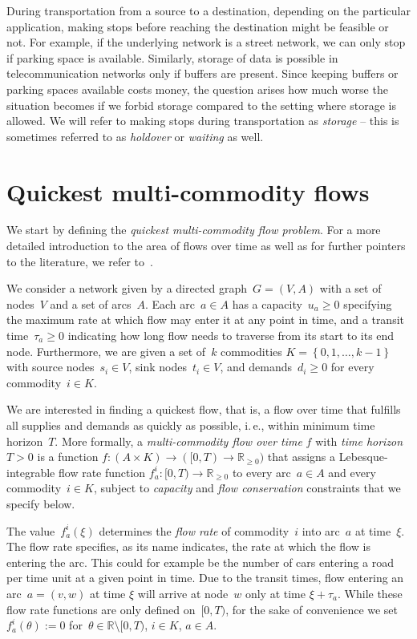 \documentclass[number]{llncs}
\newcommand{\set}[1]{\left\{#1\right\}}
\newcommand{\R}{\mathbb{R}}
\def\ie{{i.\,e.}}
\begin{document}
During transportation from a source to a destination, depending on the particular application, making stops before reaching the destination might be feasible or not. For example, if the underlying network is a street network, we can only stop if parking space is available. Similarly, storage of data is possible in telecommunication networks only if buffers are present. Since keeping buffers or parking spaces available costs money, the question arises how much worse the situation becomes if we forbid storage compared to the setting where storage is allowed. We will refer to making stops during transportation as \emph{storage} -- this is sometimes referred to as \emph{holdover} or \emph{waiting} as well.

\section{Quickest multi-commodity flows}
 
We start by defining the \emph{quickest multi-commodity flow problem}. For a more detailed introduction to the area of flows over time as well as for further pointers to the literature, we refer to~\cite{Skutella09,PhDThesisGross14}.

We consider a network given by a directed graph~$G=(V,A)$ with a set of nodes~$V$ and a set of arcs~$A$. Each arc~$a \in A$ has a capacity~$u_a\geq0$ specifying the maximum rate at which flow may enter it at any point in time, and a transit time~$\tau_a\geq0$ indicating how long flow needs to traverse from its start to its end node. Furthermore, we are given a set of~$k$ commodities $K=\set{0,1,\dots,k-1}$ with source nodes~$s_i\in V$, sink nodes~$t_i\in V$, and demands~$d_i\geq0$ for every commodity~$i\in K$. 
 
We are interested in finding a quickest flow, that is, a flow over time that fulfills all supplies and demands as quickly as possible, \ie, within minimum time horizon~$T$. More formally, a \emph{multi-commodity flow over time} $f$ with \emph{time horizon~$T>0$} is a function $f: (A \times K) \to ([0,T) \to \R_{\geq0})$ that assigns a Lebesque-integrable flow rate function $f^i_a: [0,T) \to \R_{\geq0}$ to every arc~$a\in A$ and every commodity~$i \in K$, subject to \emph{capacity} and \emph{flow conservation} constraints that we specify below.
 
The value~$f^i_a(\xi)$ determines the \emph{flow rate} of commodity~$i$ into arc~$a$ at time~$\xi$. The flow rate specifies, as its name indicates, the rate at which the flow is entering the arc. This could for example be the number of cars entering a road per time unit at a given point in time. Due to the transit times, flow entering an arc~$a = (v,w)$ at time $\xi$ will arrive at node~$w$ only at time $\xi+\tau_a$. While these flow rate functions are only defined on~$[0,T)$, for the sake of convenience we set~$f^i_a(\theta) := 0$ for~$\theta\in\R\setminus[0,T)$, $i\in K$, $a\in A$. 
\end{document}
